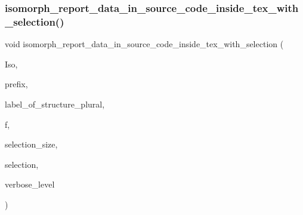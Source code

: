 \subsubsection{\texorpdfstring{isomorph\+\_\+report\+\_\+data\+\_\+in\+\_\+source\+\_\+code\+\_\+inside\+\_\+tex\+\_\+with\+\_\+selection()}{isomorph\_report\_data\_in\_source\_code\_inside\_tex\_with\_selection()}}
{\footnotesize\ttfamily void isomorph\+\_\+report\+\_\+data\+\_\+in\+\_\+source\+\_\+code\+\_\+inside\+\_\+tex\+\_\+with\+\_\+selection (\begin{DoxyParamCaption}\item[{\mbox{\hyperlink{classisomorph}{isomorph}} \&}]{Iso,  }\item[{const \mbox{\hyperlink{galois_8h_ab6cc7b4aeb6ea31aba2b3fbfc83ff5e6}{B\+Y\+TE}} $\ast$}]{prefix,  }\item[{\mbox{\hyperlink{galois_8h_ab6cc7b4aeb6ea31aba2b3fbfc83ff5e6}{B\+Y\+TE}} $\ast$}]{label\+\_\+of\+\_\+structure\+\_\+plural,  }\item[{ostream \&}]{f,  }\item[{\mbox{\hyperlink{galois_8h_a09fddde158a3a20bd2dcadb609de11dc}{I\+NT}}}]{selection\+\_\+size,  }\item[{\mbox{\hyperlink{galois_8h_a09fddde158a3a20bd2dcadb609de11dc}{I\+NT}} $\ast$}]{selection,  }\item[{\mbox{\hyperlink{galois_8h_a09fddde158a3a20bd2dcadb609de11dc}{I\+NT}}}]{verbose\+\_\+level }\end{DoxyParamCaption})}

\mbox{\label{isomorph__global_8_c_a5a73cbe9f89c4727f086482ee2d238f9}} 
